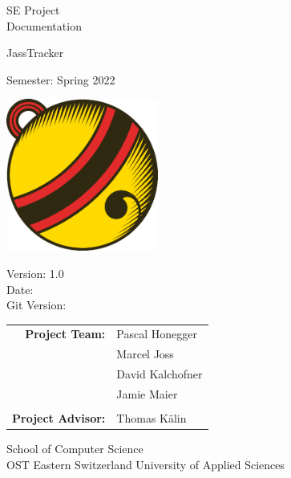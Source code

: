 \begin{titlepage}

    \begin{center}

        \vspace{1 cm}

        {\Large SE Project \\ Documentation} \\

        \vspace{0.5cm}

        {\Huge JassTracker}

        \vspace{0.5cm}

        Semester: Spring 2022

        \vspace{1 cm}

        \includegraphics[height=5cm]{resources/se-project-logo}

        \vspace{1 cm}

        Version: 1.0 \\
        Date: \DTMnow \\
        Git Version: \gitDescription
        \vspace{1 cm}

        \begin{tabular}{rl}
            \textbf{Project Team:}    & Pascal Honegger \\
                                      & Marcel Joss \\
                                      & David Kalchofner \\
                                      & Jamie Maier \\
                                      &                    \\
            \textbf{Project Advisor:} & Thomas Kälin
        \end{tabular}

        \vfill


        \vspace{1cm}
        School of Computer Science\\
        OST Eastern Switzerland University of Applied Sciences

    \end{center}

\end{titlepage}
